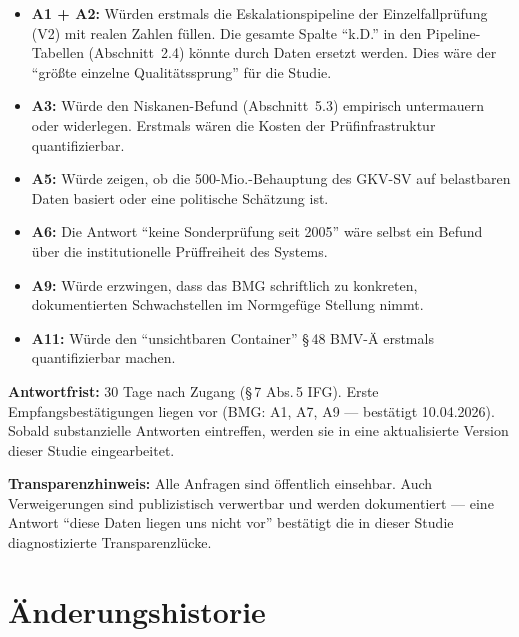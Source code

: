 \documentclass{umbruch-position}
\begin{document}
\begin{itemize}[nosep]
  \item \textbf{A1 + A2:} Würden erstmals die Eskalationspipeline der Einzelfallprüfung (V2) mit realen Zahlen füllen. Die gesamte Spalte ``k.D.'' in den Pipeline-Tabellen (Abschnitt~2.4) könnte durch Daten ersetzt werden. Dies wäre der ``größte einzelne Qualitätssprung'' für die Studie.
  \item \textbf{A3:} Würde den Niskanen-Befund (Abschnitt~5.3) empirisch untermauern oder widerlegen. Erstmals wären die Kosten der Prüfinfrastruktur quantifizierbar.
  \item \textbf{A5:} Würde zeigen, ob die 500-Mio.-Behauptung des GKV-SV auf belastbaren Daten basiert oder eine politische Schätzung ist.
  \item \textbf{A6:} Die Antwort ``keine Sonderprüfung seit 2005'' wäre selbst ein Befund über die institutionelle Prüffreiheit des Systems.
  \item \textbf{A9:} Würde erzwingen, dass das BMG schriftlich zu konkreten, dokumentierten Schwachstellen im Normgefüge Stellung nimmt.
  \item \textbf{A11:} Würde den ``unsichtbaren Container'' \S\,48 BMV-Ä erstmals quantifizierbar machen.
\end{itemize}

\textbf{Antwortfrist:} 30 Tage nach Zugang (\S\,7 Abs.\,5 IFG). Erste Empfangsbestätigungen liegen vor (BMG: A1, A7, A9 --- bestätigt 10.04.2026). Sobald substanzielle Antworten eintreffen, werden sie in eine aktualisierte Version dieser Studie eingearbeitet.

\textbf{Transparenzhinweis:} Alle Anfragen sind öffentlich einsehbar. Auch Verweigerungen sind publizistisch verwertbar und werden dokumentiert --- eine Antwort ``diese Daten liegen uns nicht vor'' bestätigt die in dieser Studie diagnostizierte Transparenzlücke.


\newpage
\section*{Änderungshistorie}
\end{document}
